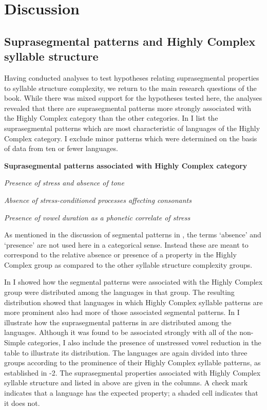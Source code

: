 \section{Discussion}\label{sec:5.5}
\subsection{Suprasegmental patterns and Highly Complex syllable structure}\label{sec:5.5.1}

  Having conducted analyses to test hypotheses relating suprasegmental properties to syllable structure complexity, we return to the main research questions of the book. While there was mixed support for the hypotheses tested here, the analyses revealed that there are suprasegmental patterns more strongly associated with the Highly Complex category than the other categories. In  I list the suprasegmental patterns which are most characteristic of languages of the Highly Complex category. I exclude minor patterns which were determined on the basis of data from ten or fewer languages.

\ea\label{ex:5.27}
  \textbf{Suprasegmental patterns associated with Highly Complex category}

\textit{Presence of stress and absence of tone}

\textit{Absence of stress-conditioned processes affecting consonants}

\textit{Presence of vowel duration as a phonetic correlate of stress}
\z

  As mentioned in the discussion of segmental patterns in , the terms ‘absence’ and ‘presence’ are not used here in a categorical sense. Instead these are meant to correspond to the relative absence or presence of a property in the Highly Complex group as compared to the other syllable structure complexity groups.

  In  I showed how the segmental patterns were associated with the Highly Complex group were distributed among the languages in that group. The resulting distribution showed that languages in which Highly Complex syllable patterns are more prominent also had more of those associated segmental patterns. In  I illustrate how the suprasegmental patterns in  are distributed among the languages. Although it was found to be associated strongly with all of the non-Simple categories, I also include the presence of unstressed vowel reduction in the table to illustrate its distribution. The languages are again divided into three groups according to the prominence of their Highly Complex syllable patterns, as established in -2. The suprasegmental properties associated with Highly Complex syllable structure and listed in  above are given in the columns. A check mark indicates that a language has the expected property; a shaded cell indicates that it does not. 

